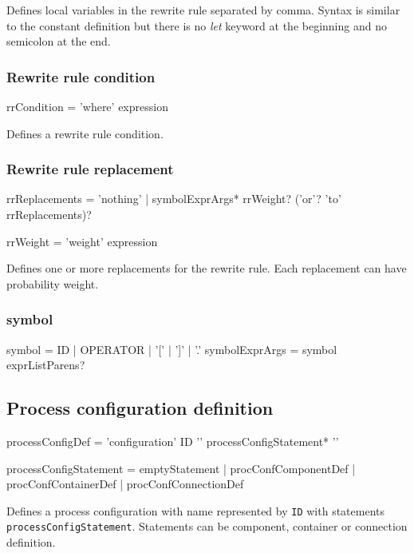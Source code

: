 Defines local variables in the rewrite rule separated by comma.
Syntax is similar to the constant definition but there is no \emph{let} keyword at the beginning and no semicolon at the end.


\subsubsection{Rewrite rule condition}
\begin{Grammar}
rrCondition = 'where' expression
\end{Grammar}

Defines a rewrite rule condition.


\subsubsection{Rewrite rule replacement}
\begin{Grammar}
rrReplacements = 'nothing'
	| symbolExprArgs* rrWeight? ('or'? 'to' rrReplacements)?

rrWeight = 'weight' expression
\end{Grammar}

Defines one or more replacements for the rewrite rule.
Each replacement can have probability weight.



\subsubsection{\lsystem symbol}
\begin{Grammar}
symbol = ID | OPERATOR | '[' | ']' | '.'
symbolExprArgs = symbol exprListParens?
\end{Grammar}


\subsection{Process configuration definition}
\begin{Grammar}
processConfigDef = 'configuration' ID '{' processConfigStatement* '}'

processConfigStatement = emptyStatement
	| procConfComponentDef
	| procConfContainerDef
	| procConfConnectionDef
\end{Grammar}

Defines a process configuration with name represented by \texttt{ID} with statements \texttt{processConfigStatement}.
Statements can be component, container or connection definition.


